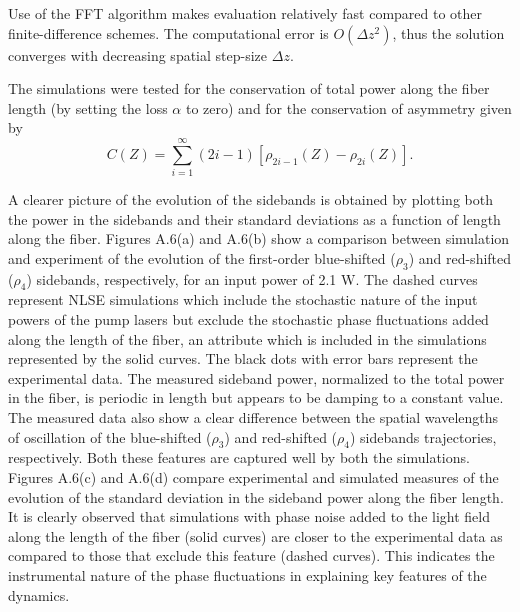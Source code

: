 Use of the FFT algorithm makes evaluation relatively fast compared to other
finite-difference schemes. The computational error is $O(\Delta z^2)$, thus
the solution converges with decreasing spatial step-size $\Delta z$.

The simulations were tested for the conservation of total power along the
fiber length (by setting the loss $\alpha$ to zero) and for the conservation
of asymmetry \cite{thompson1,hart1} given by
\begin{equation}
C(Z) = \sum_{i=1}^{\infty}(2i-1)[\rho_{2i-1}(Z)-\rho_{2i}(Z)] .
\end{equation}

A clearer picture of the evolution of the sidebands is obtained by plotting both the
power in the sidebands and their standard deviations as a function of length along the fiber. Figures A.6(a) and A.6(b) show a comparison between simulation and experiment of the evolution
of the first-order blue-shifted ($\rho_3$) and red-shifted ($\rho_4$) sidebands,
respectively, for an input power of 2.1 W. The dashed curves represent NLSE simulations
which include the stochastic nature of the input powers of the pump lasers but exclude
the stochastic phase fluctuations added along the length of the fiber, an attribute
which is included in the simulations represented by the solid curves. The black dots
with error bars represent the experimental data. The measured sideband
power, normalized to the total power in the fiber, is periodic in length but
appears to be damping to a constant value. The measured data also show a clear
difference between the spatial wavelengths of oscillation of the blue-shifted ($\rho_3$) and red-shifted ($\rho_4$) sidebands trajectories, respectively. Both these features are captured well by both the simulations. Figures A.6(c) and A.6(d) compare experimental and simulated
measures of the evolution of the standard deviation in the sideband power
along the fiber length. It is clearly observed that simulations with phase noise
added to the light field along the length of the fiber (solid curves) are closer to the
experimental data as compared to those that exclude this feature (dashed curves). This indicates
the instrumental nature of the phase fluctuations in explaining key features of the dynamics.

